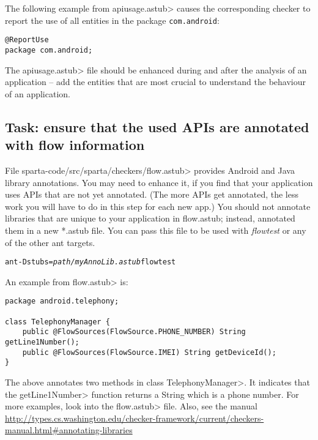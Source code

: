 The following example from \<apiusage.astub> causes the corresponding 
checker to report the use of all entities in the package 
\verb|com.android|:

\begin{Verbatim}
@ReportUse                                                         
package com.android;
\end{Verbatim}

The \<apiusage.astub> file should be enhanced during and after the 
analysis of an application -- add the entities that are most crucial to
understand the behaviour of an application.



\subsection{Task: ensure that the used APIs are annotated with flow information\label{flow-task-annotate-apis}}

File \<sparta-code/src/sparta/checkers/flow.astub> provides Android and Java
library annotations.  You may need to enhance it, if you find that your application
uses APIs that are not yet annotated.
(The  more APIs get annotated, the less work you will have to do in this
step for each new app.) You should not annotate libraries that are unique to your application in flow.astub;
instead, annotated them in a new *.astub file. You can pass this file to be used with 
\emph{flowtest} or any of the other ant targets.

\begin{alltt}
ant -Dstubs=\emph{path/myAnnoLib.astub} flowtest
\end{alltt}



An example from \<flow.astub> is:

\begin{Verbatim}
package android.telephony;

class TelephonyManager {
    public @FlowSources(FlowSource.PHONE_NUMBER) String getLine1Number();
    public @FlowSources(FlowSource.IMEI) String getDeviceId();
}
\end{Verbatim}

\noindent
The above annotates two methods in class \<TelephonyManager>.
It indicates that the \<getLine1Number> function returns a String which is a
phone number.  For more examples, look into the \<flow.astub> file. Also, see 
the manual \url{http://types.cs.washington.edu/checker-framework/current/checkers-manual.html#annotating-libraries}


